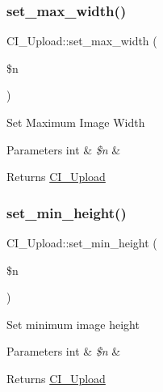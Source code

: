 \subsubsection{\texorpdfstring{set\+\_\+max\+\_\+width()}{set\_max\_width()}}
{\footnotesize\ttfamily C\+I\+\_\+\+Upload\+::set\+\_\+max\+\_\+width (\begin{DoxyParamCaption}\item[{}]{\$n }\end{DoxyParamCaption})}

Set Maximum Image Width


\begin{DoxyParams}[1]{Parameters}
int & {\em \$n} & \\
\hline
\end{DoxyParams}
\begin{DoxyReturn}{Returns}
\mbox{\hyperlink{class_c_i___upload}{C\+I\+\_\+\+Upload}} 
\end{DoxyReturn}
\mbox{\label{class_c_i___upload_a0a2346dbdbc48828e1c0c14941524a36}} 
\subsubsection{\texorpdfstring{set\+\_\+min\+\_\+height()}{set\_min\_height()}}
{\footnotesize\ttfamily C\+I\+\_\+\+Upload\+::set\+\_\+min\+\_\+height (\begin{DoxyParamCaption}\item[{}]{\$n }\end{DoxyParamCaption})}

Set minimum image height


\begin{DoxyParams}[1]{Parameters}
int & {\em \$n} & \\
\hline
\end{DoxyParams}
\begin{DoxyReturn}{Returns}
\mbox{\hyperlink{class_c_i___upload}{C\+I\+\_\+\+Upload}} 
\end{DoxyReturn}
\mbox{\label{class_c_i___upload_a03f270957d44271611b02d0a9efd321e}} 

